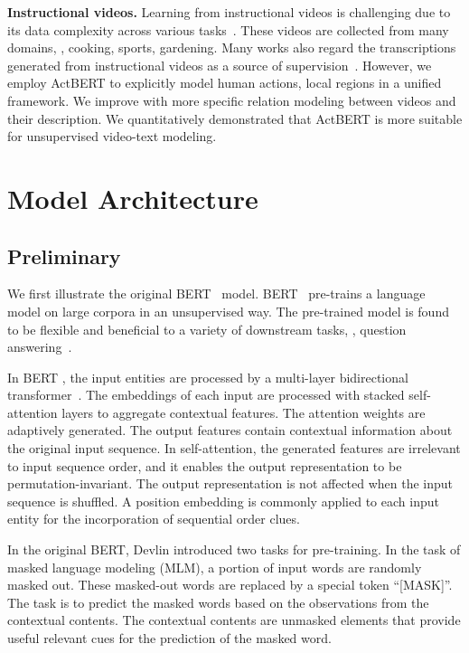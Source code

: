 \documentclass[10pt,twocolumn,letterpaper]{article}
\newcommand{\ours}{ActBERT\xspace}
\begin{document}
\noindent\textbf{Instructional videos.}
Learning from instructional videos is challenging  due to its data complexity across various tasks~\cite{damen2018scaling,alayrac2016unsupervised,zhou2018towards,miech2019howto100m}.
These videos are collected from many domains, \eg, cooking, sports, gardening.
Many works also regard the transcriptions generated from instructional videos as a source of supervision~\cite{alayrac2016unsupervised,zhou2018towards,miech2019howto100m}. However, we employ \ours to explicitly model human actions, local regions in a unified framework. We improve \cite{miech2019howto100m} with more specific relation modeling between videos and their description. We quantitatively demonstrated that  \ours is more suitable for unsupervised video-text modeling.

\section{Model Architecture}
\subsection{Preliminary}
\label{sec:preliminary}
We first illustrate the original BERT~\cite{devlin2018bert} model.
BERT~\cite{devlin2018bert} pre-trains a language model on large corpora in an unsupervised way. The pre-trained model is found to be flexible and beneficial to a variety of downstream tasks, \eg, question answering~\cite{alberti2019bert}.

In BERT \cite{devlin2018bert}, the input entities are processed by a multi-layer bidirectional transformer~\cite{vaswani2017attention}. The embeddings of each input are processed with stacked self-attention layers to aggregate contextual features. The attention weights are adaptively generated. The output features contain contextual information about the original input sequence.
In self-attention, the generated features are irrelevant to input sequence order, and it enables the output representation to be permutation-invariant.  The output representation is not affected when the input sequence is shuffled. A position embedding is commonly applied to each input entity for the incorporation of sequential order clues.

In the original BERT, Devlin \etal introduced two tasks for pre-training.
In the task of masked language modeling (MLM), a portion of input words are randomly masked out. These masked-out words are replaced by a special token ``[MASK]''.
The task is to predict the masked words based on the observations from the contextual contents.
The contextual contents are unmasked elements that provide useful relevant cues for the prediction of the masked word.
\end{document}
